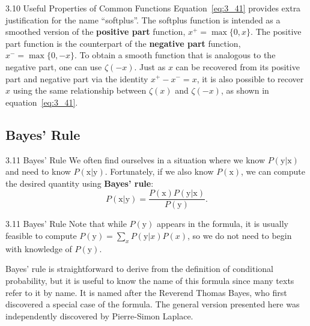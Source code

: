 \begin{frame}{3.10 Useful Properties of Common Functions}
    \justifying
    Equation~\ref{eq:3_41} provides extra justification for the name ``softplus''. The softplus function is intended as a smoothed version of the \textbf{positive part} function, $x^{+} = \max\{0, x\}$. The positive part function is the counterpart of the \textbf{negative part} function, $x^{-} = \max\{0, -x\}$. To obtain a smooth function that is analogous to the negative part, one can use $\zeta(-x)$. Just as $x$ can be recovered from its positive part and negative part via the identity $x^{+} - x^{-} = x$, it is also possible to recover $x$ using the same relationship between $\zeta(x)$ and $\zeta(-x)$, as shown in equation~\ref{eq:3_41}.
\end{frame}

\subsection{Bayes' Rule}
\begin{frame}{3.11 Bayes' Rule}
    \justifying
    We often find ourselves in a situation where we know $P(\mathrm{y} | \mathrm{x})$ and need to know $P(\mathrm{x} | \mathrm{y})$. Fortunately, if we also know $P(\mathrm{x})$, we can compute the desired quantity using \textbf{Bayes’ rule}:
    \begin{equation}
        P(\mathrm{x} | \mathrm{y}) = \frac{P(\mathrm{x}) P(\mathrm{y} | \mathrm{x})}{P(\mathrm{y})}.
        \label{eq:3_42}
    \end{equation}
\end{frame}

\begin{frame}{3.11 Bayes' Rule}
    \justifying   
    Note that while $P(\mathrm{y})$ appears in the formula, it is usually feasible to compute $P(\mathrm{y}) = \sum_{x} P(\mathrm{y} | x) P(x)$, so we do not need to begin with knowledge of $P(\mathrm{y})$.
    
    Bayes’ rule is straightforward to derive from the definition of conditional probability, but it is useful to know the name of this formula since many texts refer to it by name. It is named after the Reverend Thomas Bayes, who first discovered a special case of the formula. The general version presented here was independently discovered by Pierre-Simon Laplace.
\end{frame}

